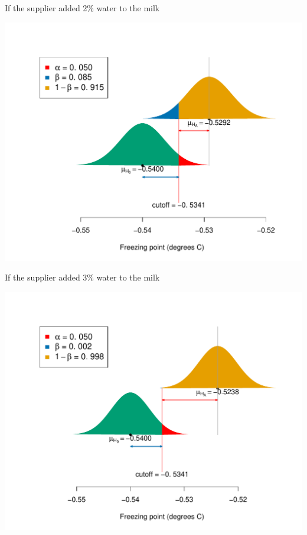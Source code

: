 \documentclass[10pt]{beamer}\usepackage[]{graphicx}\usepackage[]{color}
\makeatletter
\def\maxwidth{ %
  \ifdim\Gin@nat@width>\linewidth
    \linewidth
  \else
    \Gin@nat@width
  \fi
}
\newenvironment{knitrout}{}{} %
\makeatother
\begin{document}
\begin{frame}[fragile]{If the supplier added 2\% water to the milk}
\begin{knitrout}\tiny
{}\color{fgcolor}

{\centering \includegraphics[width=\maxwidth]{figure/unnamed-chunk-8-1} 

}



\end{knitrout}
\end{frame}

\begin{frame}[fragile]{If the supplier added 3\% water to the milk}
\begin{knitrout}\tiny
{}\color{fgcolor}

{\centering \includegraphics[width=\maxwidth]{figure/unnamed-chunk-9-1} 

}



\end{knitrout}
\end{frame}
\end{document}
